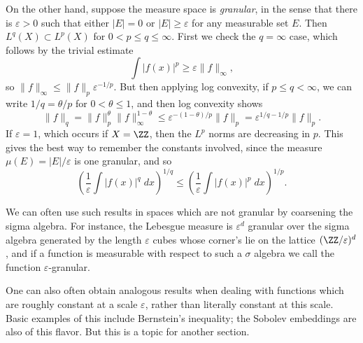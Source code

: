 \begin{example}
  On the other hand, suppose the measure space is {\it granular}, in the sense that there is $\varepsilon > 0$ such that either $|E| = 0$ or $|E| \geq \varepsilon$ for any measurable set $E$. Then $L^q(X) \subset L^p(X)$ for $0 < p \leq q \leq \infty$. First we check the $q = \infty$ case, which follows by the trivial estimate
  \[ \int |f(x)|^p \geq \varepsilon \| f \|_\infty, \]
  so $\| f \|_\infty \leq \| f \|_p \varepsilon^{-1/p}$. But then applying log convexity, if $p \leq q < \infty$, we can write $1/q = \theta/p$ for $0 < \theta \leq 1$, and then log convexity shows
  \[ \| f \|_q = \| f \|_p^\theta \| f \|_\infty^{1-\theta} \leq \varepsilon^{-(1 - \theta)/p} \| f \|_p = \varepsilon^{1/q-1/p} \| f \|_p. \]
  If $\varepsilon = 1$, which occurs if $X = \ZZ$, then the $L^p$ norms are decreasing in $p$. This gives the best way to remember the constants involved, since the measure $\mu(E) = |E|/\varepsilon$ is one granular, and so
  \[ \left( \frac{1}{\varepsilon} \int |f(x)|^q\; dx \right)^{1/q} \leq \left( \frac{1}{\varepsilon} \int |f(x)|^p\; dx \right)^{1/p}. \]
\end{example}



\begin{remark}
  We can often use such results in spaces which are not granular by coarsening the sigma algebra. For instance, the Lebesgue measure is $\varepsilon^d$ granular over the sigma algebra generated by the length $\varepsilon$ cubes whose corner's lie on the lattice $(\ZZ/\varepsilon)^d$, and if a function is measurable with respect to such a $\sigma$ algebra we call the function $\varepsilon$-granular.

  One can also often obtain analogous results when dealing with functions which are roughly constant at a scale $\varepsilon$, rather than literally constant at this scale. Basic examples of this include Bernstein's inequality; the Sobolev embeddings are also of this flavor. But this is a topic for another section.
\end{remark}

